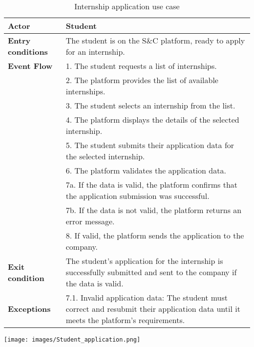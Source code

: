 \begin{table}[h!]
    \centering
    \begin{tabular}{lp{10cm}}
        \textbf{Actor} & Student \\ \hline
        \textbf{Entry conditions} & The student is on the S\&C platform, ready to apply for an internship. \\ \hline
        \textbf{Event Flow} & 
        1. The student requests a list of internships. \\
        & 2. The platform provides the list of available internships. \\
        & 3. The student selects an internship from the list. \\
        & 4. The platform displays the details of the selected internship. \\
        & 5. The student submits their application data for the selected internship. \\
        & 6. The platform validates the application data. \\
        & 7a. If the data is valid, the platform confirms that the application submission was successful. \\
        & 7b. If the data is not valid, the platform returns an error message. \\
        & 8. If valid, the platform sends the application to the company. \\
        \hline
        \textbf{Exit condition} & The student's application for the internship is successfully submitted and sent to the company if the data is valid. \\ \hline
        \textbf{Exceptions} & 
        7.1. Invalid application data: The student must correct and resubmit their application data until it meets the platform's requirements. \\
    \end{tabular}
    \caption{Internship application use case}
    \label{tab:internship_application}
\end{table}


\begin{center}
    \texttt{[image: images/Student\_application.png]}
\end{center}

\newpage
